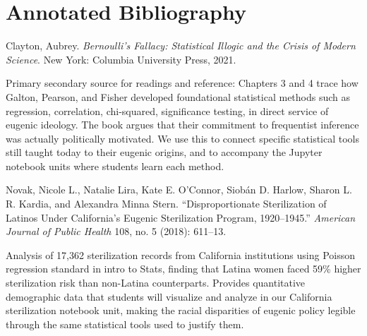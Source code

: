 \documentclass[12pt]{article}
\begin{document}
\newenvironment{bibentry}
  {\par\vspace{12pt}\noindent\hangindent=0.5in\hangafter=1\leftskip=0pt}
  {}

\newenvironment{annotation}
  {\par\leftskip=0.5in\parindent=0pt}
  {\par\leftskip=0pt}

\section*{Annotated Bibliography}

\vspace{-12pt}

\begin{bibentry}
Clayton, Aubrey. \textit{Bernoulli's Fallacy: Statistical Illogic and the Crisis of Modern Science}. New York: Columbia University Press, 2021.
\end{bibentry}
\begin{annotation}
Primary secondary source for readings and reference: Chapters 3 and 4 trace how Galton, Pearson, and Fisher developed foundational statistical methods such as regression, correlation, chi-squared, significance testing, in direct service of eugenic ideology. The book argues that their commitment to frequentist inference was actually politically motivated. We use this to connect specific statistical tools still taught today to their eugenic origins, and to accompany the Jupyter notebook units where students learn each method.
\end{annotation}

\begin{bibentry}
Novak, Nicole L., Natalie Lira, Kate E. O'Connor, Siob\'{a}n D. Harlow, Sharon L. R. Kardia, and Alexandra Minna Stern. ``Disproportionate Sterilization of Latinos Under California's Eugenic Sterilization Program, 1920--1945.'' \textit{American Journal of Public Health} 108, no. 5 (2018): 611--13.
\end{bibentry}
\begin{annotation}
Analysis of 17,362 sterilization records from California institutions using Poisson regression standard in intro to Stats, finding that Latina women faced 59\% higher sterilization risk than non-Latina counterparts. Provides quantitative demographic data that students will visualize and analyze in our California sterilization notebook unit, making the racial disparities of eugenic policy legible through the same statistical tools used to justify them.
\end{annotation}
\end{document}
